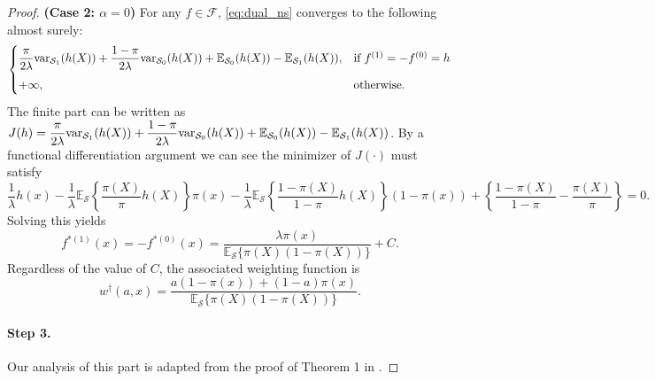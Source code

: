 \documentclass[12pt]{article}
\newcommand{\E}{\mathbb{E}}
\newcommand{\var}{\textnormal{var}}
\begin{document}
\begin{proof}
	
	\bigskip
	
	\noindent \textbf{(Case 2: $\alpha = 0$)} For any $f \in \mathcal{F}$, \eqref{eq:dual_ns} converges to the following almost surely:
	\begin{equation}
		\label{eq:dual_obj_case2}
		\begin{cases}
			\dfrac{\pi}{2\lambda} \var_{\mathcal{S}_1}(h(X)) +
			\dfrac{1-\pi}{2\lambda} \var_{\mathcal{S}_0}(h(X)) +
			\E_{\mathcal{S}_0}(h(X)) -
			\E_{\mathcal{S}_1}(h(X)),
			&\text{if } f^{(1)} = -f^{(0)} = h 
			\vspace{6pt}\\
			+\infty, &\text{otherwise}.
		\end{cases}
	\end{equation}
	The finite part can be written as
	$
	J(h) =
	\dfrac{\pi}{2\lambda} \var_{\mathcal{S}_1}(h(X)) +
	\dfrac{1-\pi}{2\lambda} \var_{\mathcal{S}_0}(h(X)) +
	\E_{\mathcal{S}_0}(h(X)) -
	\E_{\mathcal{S}_1}(h(X))
	$. By a functional differentiation argument we can see the minimizer of $J(\cdot)$ must satisfy
	\begin{equation*}
		\frac{1}{\lambda} h(x) -
		\frac{1}{\lambda} \E_{\mathcal{S}} \left\{ \frac{\pi(X)}{\pi} h(X) \right\} \pi(x) -
		\frac{1}{\lambda} \E_{\mathcal{S}} \left\{ \frac{1-\pi(X)}{1-\pi} h(X) \right\} (1-\pi(x)) +
		\left\{ \frac{1-\pi(X)}{1-\pi} - \frac{\pi(X)}{\pi} \right\}
		= 0
		.\end{equation*}
	Solving this yields
	\begin{equation*}
		f^{*(1)}(x) = -f^{*(0)}(x) = \frac{\lambda \pi(x)}{\E_{\mathcal{S}}\{\pi(X)(1-\pi(X))\}} + C
		.\end{equation*}
	Regardless of the value of $C$, the associated weighting function is 
	\begin{equation*}
		w^\dagger(a, x) = \frac{a(1-\pi(x)) + (1-a)\pi(x)}{\E_{\mathcal{S}} \{\pi(X)(1-\pi(X))\}}
		.\end{equation*}
	
	\paragraph{Step 3.}
	Our analysis of this part is adapted from the proof of Theorem 1 in \citet{hirshberg2017augmented}.
	

\end{proof}
\end{document}
